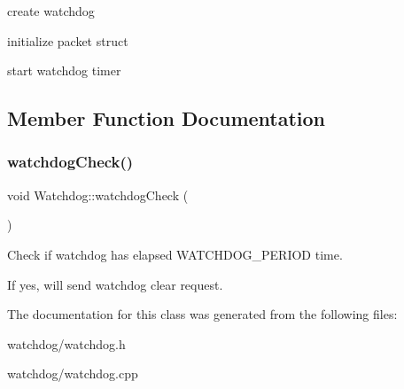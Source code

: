create watchdog 

initialize packet struct

start watchdog timer 

\subsection{Member Function Documentation}
\mbox{\label{classWatchdog_a37f012036421572ddef5ad3a8272c389}} 
\subsubsection{\texorpdfstring{watchdog\+Check()}{watchdogCheck()}}
{\footnotesize\ttfamily void Watchdog\+::watchdog\+Check (\begin{DoxyParamCaption}{ }\end{DoxyParamCaption})}



Check if watchdog has elapsed W\+A\+T\+C\+H\+D\+O\+G\+\_\+\+P\+E\+R\+I\+OD time. 

If yes, will send watchdog clear request. 

The documentation for this class was generated from the following files\+:\begin{DoxyCompactItemize}
\item 
watchdog/watchdog.\+h\item 
watchdog/watchdog.\+cpp\end{DoxyCompactItemize}
